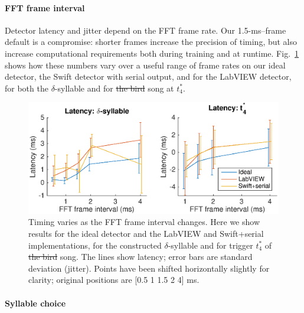 \documentclass[10pt,letterpaper]{article}
\newcommand\fig[1]{Fig.~\ref{#1}}
\renewcommand{\subsubsection}[1]{\paragraph{#1}}
\providecommand{\DIFaddtex}[1]{{\protect\color{blue}\uwave{#1}}} %
\providecommand{\DIFdeltex}[1]{{\protect\color{red}\sout{#1}}}                      %
\providecommand{\DIFaddbegin}{} %
\providecommand{\DIFaddend}{} %
\providecommand{\DIFdelbegin}{} %
\providecommand{\DIFdelend}{} %
\providecommand{\DIFaddFL}[1]{\DIFadd{#1}} %
\providecommand{\DIFdelFL}[1]{\DIFdel{#1}} %
\providecommand{\DIFaddbeginFL}{} %
\providecommand{\DIFaddendFL}{} %
\providecommand{\DIFdelbeginFL}{} %
\providecommand{\DIFdelendFL}{} %
\providecommand{\DIFadd}[1]{\texorpdfstring{\DIFaddtex{#1}}{#1}} %
\providecommand{\DIFdel}[1]{\texorpdfstring{\DIFdeltex{#1}}{}} %
\newcommand{\DIFscaledelfig}{0.5}
\newlength{\DIFdelgraphicswidth} %
\newlength{\DIFdelgraphicsheight} %
\newcommand{\DIFaddincludegraphics}[2][]{{\color{blue}\fbox{\DIFOincludegraphics[#1]{#2}}}} %
\newcommand{\DIFdelincludegraphics}[2][]{%
\sbox{\DIFdelgraphicsbox}{\DIFOincludegraphics[#1]{#2}}%
\settoboxwidth{\DIFdelgraphicswidth}{\DIFdelgraphicsbox} %
\settoboxtotalheight{\DIFdelgraphicsheight}{\DIFdelgraphicsbox} %
\scalebox{\DIFscaledelfig}{%
\parbox[b]{\DIFdelgraphicswidth}{\usebox{\DIFdelgraphicsbox}\\[-\baselineskip] \rule{\DIFdelgraphicswidth}{0em}}\llap{\resizebox{\DIFdelgraphicswidth}{\DIFdelgraphicsheight}{%
\setlength{\unitlength}{\DIFdelgraphicswidth}%
\begin{picture}(1,1)%
\thicklines\linethickness{2pt} %
{\color[rgb]{1,0,0}\put(0,0){\framebox(1,1){}}}%
{\color[rgb]{1,0,0}\put(0,0){\line( 1,1){1}}}%
{\color[rgb]{1,0,0}\put(0,1){\line(1,-1){1}}}%
\end{picture}%
}\hspace*{3pt}}} %
} %
\DeclareRobustCommand{\DIFaddbegin}{\DIFOaddbegin \let\includegraphics\DIFaddincludegraphics} %
\DeclareRobustCommand{\DIFaddend}{\DIFOaddend \let\includegraphics\DIFOincludegraphics} %
\DeclareRobustCommand{\DIFdelbegin}{\DIFOdelbegin \let\includegraphics\DIFdelincludegraphics} %
\DeclareRobustCommand{\DIFdelend}{\DIFOaddend \let\includegraphics\DIFOincludegraphics} %
\DeclareRobustCommand{\DIFaddbeginFL}{\DIFOaddbeginFL \let\includegraphics\DIFaddincludegraphics} %
\DeclareRobustCommand{\DIFaddendFL}{\DIFOaddendFL \let\includegraphics\DIFOincludegraphics} %
\DeclareRobustCommand{\DIFdelbeginFL}{\DIFOdelbeginFL \let\includegraphics\DIFdelincludegraphics} %
\DeclareRobustCommand{\DIFdelendFL}{\DIFOaddendFL \let\includegraphics\DIFOincludegraphics} %
\begin{document}
\subsubsection{FFT frame interval}

Detector latency and jitter depend on the FFT frame rate.  Our
1.5-ms--frame default is a compromise: shorter frames increase the
precision of timing, but also increase computational requirements both
during training and at runtime.  \fig{fig:TimingVsFrame} shows how
these numbers vary over a useful range of frame rates on our ideal
detector, the Swift detector with serial output, and for the LabVIEW
detector, for both the $\delta$-syllable and for \DIFdelbegin \DIFdel{the bird }\DIFdelend \DIFaddbegin \DIFadd{lny64's }\DIFaddend song at
$t^*_4$.

\begin{figure}
  \includegraphics[width=\textwidth]{Fig4}
  \caption{Timing varies as the FFT frame interval changes.  Here we
    show results for the ideal detector and the LabVIEW and
    Swift+serial implementations, for the constructed
    $\delta$-syllable and for trigger $t^*_4$ of \DIFdelbeginFL \DIFdelFL{the bird }\DIFdelendFL \DIFaddbeginFL \DIFaddFL{lny64's }\DIFaddendFL song.  The
    lines show latency; error bars are standard deviation (jitter).  Points have
    been shifted horizontally slightly for clarity; original positions are [0.5 1
      1.5 2 4] ms.}
  \label{fig:TimingVsFrame}
\end{figure}

\subsubsection{Syllable choice}
\end{document}
